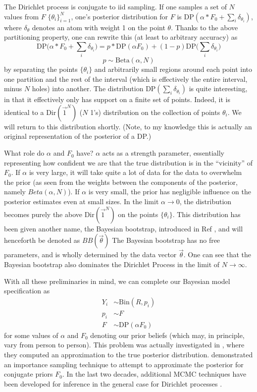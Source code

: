 The Dirichlet process is conjugate to iid sampling. If one samples a set of $N$ values from $F$ $\{\theta_i\}_{i=1}^N$, one's posterior distribution for $F$ is DP$(\alpha*F_0+\sum_i \delta_{\theta_i})$, where $\delta_\theta$ denotes an atom with weight 1 on the point $\theta$. Thanks to the above partitioning property, one can rewrite this (at least to arbitrary accuracy) as \[\mathrm{DP}\big(\alpha*F_0+\sum_i \delta_{\theta_i}\big) = p*\mathrm{DP}(\alpha F_0) + (1-p)\mathrm{DP}\big(\sum_i \delta_{\theta_i}\big)\] \[p \sim \mathrm{Beta}(\alpha,N)\] by separating the points $\{\theta_i\}$ and arbitrarily small regions around each point into one partition and the rest of the interval (which is effectively the entire interval, minus $N$ holes) into another. The distribution DP$(\sum_i \delta_{\theta_i})$ is quite interesting, in that it effectively only has support on a finite set of points. Indeed, it is identical to a Dir$(\vec{1}^N)$ ($N$ 1's) distribution on the collection of points $\theta_i$. We will return to this distribution shortly. (Note, to my knowledge this is actually an original representation of the posterior of a DP.)

What role do $\alpha$ and $F_0$ have? $\alpha$ acts as a strength parameter, essentially representing how confident we are that the true distribution is in the ``vicinity'' of $F_0$. If $\alpha$ is very large, it will take quite a lot of data for the data to overwhelm the prior (as seen from the weights between the components of the posterior, namely $Beta(\alpha,N)$). If $\alpha$ is very small, the prior has negligible influence on the posterior estimates even at small sizes. In the limit $\alpha\rightarrow 0$, the distribution becomes purely the above Dir$(\vec{1}^N)$ on the points $\{\theta_i\}$. This distribution has been given another name, the Bayesian bootstrap, introduced in Ref \cite{rubin1981bayesian}, and will henceforth be denoted as $BB(\vec\theta)$ The Bayesian bootstrap has no free parameters, and is wholly determined by the data vector $\vec\theta$. One can see that the Bayesian bootstrap also dominates the Dirichlet Process in the limit of $N\rightarrow\infty$.

With all these preliminaries in mind, we can complete our Bayesian model specification as
\begin{align*}
	Y_i &\sim \mathrm{Bin}(R,p_i) \\
	p_i &\sim F \\
	F &\sim \mathrm{DP}(\alpha F_0)
\end{align*}
for some values of $\alpha$ and $F_0$ denoting our prior beliefs (which may, in principle, vary from person to person). This problem was actually investigated in \cite{BerryChristensen1979}, where they computed an approximation to the true posterior distribution. \cite{Kuo1986a} demonstrated an importance sampling technique to attempt to approximate the posterior for conjugate priors $F_0$. In the last two decades, additional MCMC techniques have been developed for inference in the general case for Dirichlet processes \cite{gelfand2002}.

